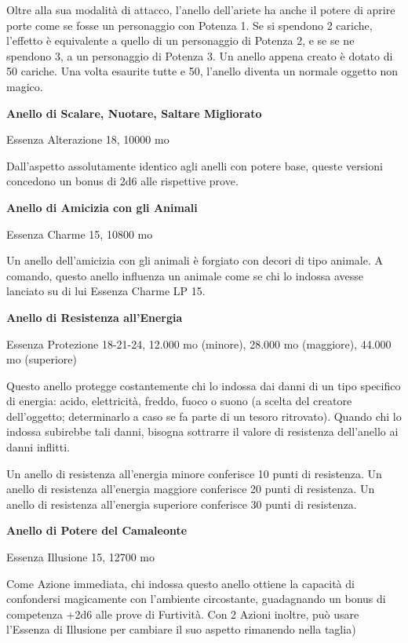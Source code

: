 \documentclass[a4paper,11pt,twoside,openany]{book}
\begin{document}
Oltre alla sua modalità di attacco, l'anello dell'ariete ha anche il potere di aprire porte come se fosse un personaggio con Potenza 1. Se si spendono 2 cariche, l'effetto è equivalente a quello di un personaggio di Potenza 2, e se se ne spendono 3, a un personaggio di Potenza 3. Un anello appena creato è dotato di 50 cariche. Una volta esaurite tutte e 50, l'anello diventa un normale oggetto non magico.

\textbf{Anello di Scalare, Nuotare, Saltare Migliorato}

Essenza Alterazione 18, 10000 mo

Dall'aspetto assolutamente identico agli anelli con potere base, queste
versioni concedono un bonus di 2d6 alle rispettive prove.

\textbf{Anello di Amicizia con gli Animali}

Essenza Charme 15, 10800 mo

Un anello dell'amicizia con gli animali è forgiato con decori di tipo animale. A comando, questo anello influenza un animale come se chi lo indossa avesse lanciato su di lui Essenza Charme LP 15.

\textbf{Anello di Resistenza all'Energia}

Essenza Protezione 18-21-24, 12.000 mo (minore), 28.000 mo (maggiore),
44.000 mo (superiore)

Questo anello protegge costantemente chi lo indossa dai danni di un tipo specifico di energia: acido, elettricità, freddo, fuoco o suono (a scelta del creatore dell'oggetto; determinarlo a caso se fa parte di un tesoro ritrovato). Quando chi lo indossa subirebbe tali danni, bisogna sottrarre il valore di resistenza dell'anello ai danni inflitti.

Un anello di resistenza all'energia minore conferisce 10 punti di resistenza. Un anello di resistenza all'energia maggiore conferisce 20 punti di resistenza. Un anello di resistenza all'energia superiore conferisce 30 punti di resistenza.

\textbf{Anello di Potere del Camaleonte}

Essenza Illusione 15, 12700 mo

Come Azione immediata, chi indossa questo anello ottiene la capacità di confondersi magicamente con l'ambiente circostante, guadagnando un bonus di competenza +2d6 alle prove di Furtività. Con 2 Azioni inoltre, può usare l'Essenza di Illusione per cambiare il suo aspetto rimanendo nella taglia)
\end{document}
